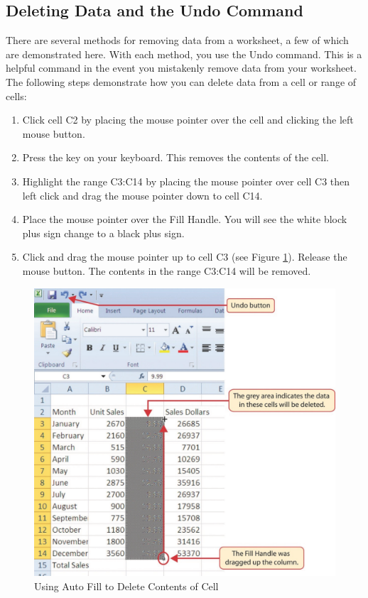\subsection{Deleting Data and the Undo Command}

There are several methods for removing data from a worksheet, a few of which are demonstrated here. With each method, you use the Undo command. This is a helpful command in the event you mistakenly remove data from your worksheet. The following steps demonstrate how you can delete data from a cell or range of cells:

\begin{enumerate}
	\item Click cell \textsf{C2} by placing the mouse pointer over the cell and clicking the left mouse button.
	\item Press the  key on your keyboard. This removes the contents of the cell.
	\item Highlight the range \textsf{C3:C14} by placing the mouse pointer over cell \textsf{C3} then left click and drag the mouse pointer down to cell \textsf{C14}.
	\item Place the mouse pointer over the Fill Handle. You will see the white block plus sign change to a black plus sign.
	\item Click and drag the mouse pointer up to cell \textsf{C3} (see Figure \ref{01:fig21}). Release the mouse button. The contents in the range \textsf{C3:C14} will be removed.
\end{enumerate}

\begin{figure}[H]
	\centering
	\includegraphics[width=\maxwidth{.95\linewidth}]{gfx/ch01_fig21}
	\caption{Using Auto Fill to Delete Contents of Cell}
	\label{01:fig21}
\end{figure}

